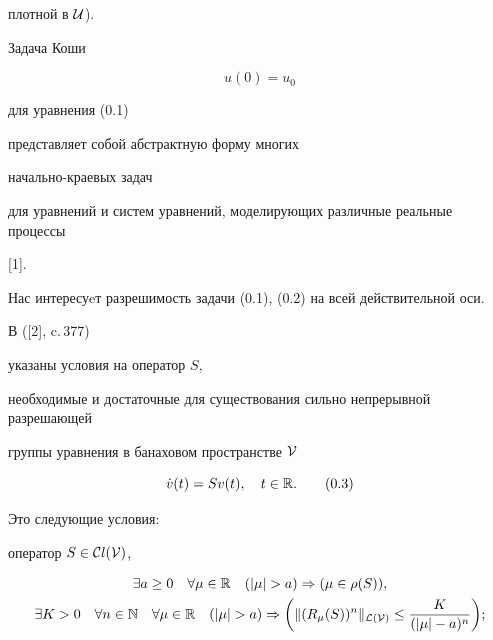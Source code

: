 плотной в ${\cal U}$).





Задача Коши


\begin{equation}


u(0)=u_0\tag{0.2}


\end{equation}


для уравнения (0.1)


представляет собой абстрактную форму многих


начально-краевых задач


для уравнений и систем уравнений, моделирующих различные реальные процессы


[1].





Нас интересуeт разрешимость задачи (0.1), (0.2) на всей действительной оси.


В ([2], c.\,377)


указаны условия на оператор $S$,


необходимые и достаточные для существования сильно непрерывной разрешающей


группы уравнения в банаховом пространстве ${\cal V}$


\begin{equation}


\Dot v(t)=Sv(t),\quad t\in {\Bbb R}.\tag{0.3}


\end{equation}


Это следующие условия:


оператор $S\in {\cal C}l{(\cal V)}$,


\begin{gather*}


\exists a\ge 0\quad \forall \mu \in {\Bbb R}


\quad (|\mu |>a)


\Rightarrow (\mu \in \rho (S)),\\


%


\exists K>0  \quad \forall n \in


{\Bbb N} \quad \forall \mu \in {\Bbb R} \quad


(| \mu |>a) \Rightarrow \bigg( \| (R_{\mu } (S))^n \|_{\cal L (\cal V)}


\le \frac{K}


{(|\mu |-a)^n } \bigg);


\end{gather*}


